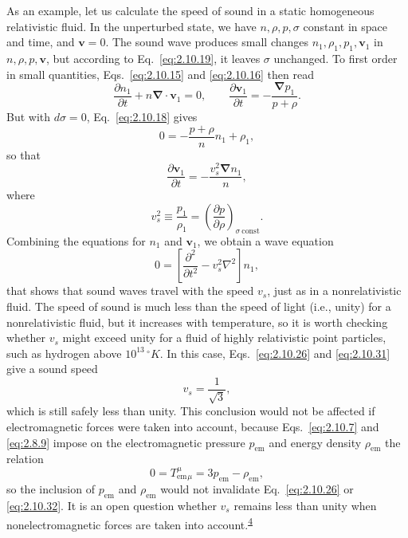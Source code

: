 As an example, let us calculate the speed of sound in a static homogeneous
relativistic fluid. In the unperturbed state, we have \(n,\rho,p,\sigma\)
constant in space and time, and \(\mathbf v=0\). The sound wave produces small
changes \(n_1,\rho_1,p_1,\mathbf v_1\) in \(n,\rho,p,\mathbf v\), but
according to Eq.~\eqref{eq:2.10.19}, it leaves \(\sigma\) unchanged. To first
order in small quantities, Eqs.~\eqref{eq:2.10.15} and
\eqref{eq:2.10.16} then read
\[
  \frac{\partial n_1}{\partial t}
  +n\boldsymbol{\nabla}\cdot\mathbf v_1=0,
  \qquad
  \frac{\partial\mathbf v_1}{\partial t}
  =-\frac{\boldsymbol{\nabla}p_1}{p+\rho}.
\]
But with \(d\sigma=0\), Eq.~\eqref{eq:2.10.18} gives
\[
  0=-\frac{p+\rho}{n}n_1+\rho_1,
\]
so that
\[
  \frac{\partial\mathbf v_1}{\partial t}
  =-\frac{v_s^2\boldsymbol{\nabla}n_1}{n},
\]
where
\begin{equation}
  v_s^2\equiv\frac{p_1}{\rho_1}
  =\left(\frac{\partial p}{\partial\rho}\right)_{\sigma\ \mathrm{const}}.
  \tag{2.10.31}\label{eq:2.10.31}
\end{equation}
Combining the equations for \(n_1\) and \(\mathbf v_1\), we obtain a wave
equation
\[
  0=\left[
    \frac{\partial^2}{\partial t^2}
    -v_s^2\nabla^2
  \right]n_1,
\]
that shows that sound waves travel with the speed \(v_s\), just as in a
nonrelativistic fluid. The speed of sound is much less than the speed of light
(i.e., unity) for a nonrelativistic fluid, but it increases with temperature, so
it is worth checking whether \(v_s\) might exceed unity for a fluid of highly
relativistic point particles, such as hydrogen above \(10^{13}\,{}^\circ\!K\).
In this case, Eqs.~\eqref{eq:2.10.26} and \eqref{eq:2.10.31} give a sound
speed
\begin{equation}
  v_s=\frac1{\sqrt3},
  \tag{2.10.32}\label{eq:2.10.32}
\end{equation}
which is still safely less than unity. This conclusion would not be affected if
electromagnetic forces were taken into account, because Eqs.~\eqref{eq:2.10.7}
and \eqref{eq:2.8.9} impose on the electromagnetic pressure
\(p_{\mathrm{em}}\) and energy density \(\rho_{\mathrm{em}}\) the relation
\begin{equation}
  0=T_{\mathrm{em}}^\mu{}_\mu
  =3p_{\mathrm{em}}-\rho_{\mathrm{em}},
  \tag{2.10.33}\label{eq:2.10.33}
\end{equation}
so the inclusion of \(p_{\mathrm{em}}\) and \(\rho_{\mathrm{em}}\) would not
invalidate Eq.~\eqref{eq:2.10.26} or \eqref{eq:2.10.32}. It is an open
question whether \(v_s\) remains less than unity when nonelectromagnetic forces
are taken into account.\textsuperscript{\hyperref[ch2-ref-4]{4}}
